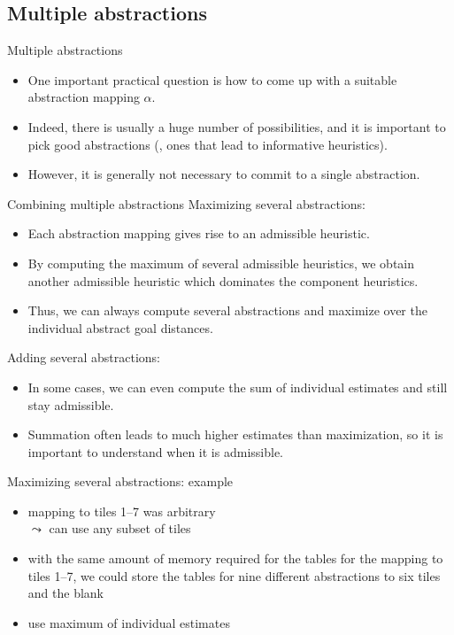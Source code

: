 \documentclass{gkibeamer}
\begin{document}
\subsection{Multiple abstractions}

\begin{frame}{Multiple abstractions}
  \begin{itemize}
  \item One important practical question is how to come up with
    a suitable abstraction mapping $\alpha$.
  \item Indeed, there is usually a \alert{huge number of
    possibilities}, and it is important to pick good abstractions
    (\ie, ones that lead to informative heuristics).
  \item However, it is generally \alert{not necessary to commit to a
    single abstraction}.
  \end{itemize}
\end{frame}

\begin{frame}{Combining multiple abstractions}
  \alert{Maximizing} several abstractions:
  \begin{itemize}
  \item Each abstraction mapping gives rise to an admissible
    heuristic.
  \item By computing the \alert{maximum} of several admissible
    heuristics, we obtain another admissible heuristic which
    \alert{dominates} the component heuristics.
  \item Thus, we can always compute several abstractions and maximize
    over the individual abstract goal distances.
  \end{itemize}

  \medskip

  \alert{Adding} several abstractions:
  \begin{itemize}
  \item In some cases, we can even compute the \alert{sum} of
    individual estimates and still stay admissible.
  \item Summation often leads to \alert{much higher estimates} than
    maximization, so it is \alert{important to understand when it is
      admissible}.
  \end{itemize}
\end{frame}

\begin{frame}{Maximizing several abstractions: example}
  \begin{example}[15-puzzle]
    \begin{itemize}
    \item mapping to tiles 1--7 was arbitrary \\
      $\leadsto$ can use \alert{any subset} of tiles
    \item with the same amount of memory required for the tables for
      the mapping to tiles 1--7, we could store the tables for
      \alert{nine different abstractions} to six tiles and the blank
    \item use \alert{maximum} of individual estimates
    \end{itemize}
  \end{example}
\end{frame}
\end{document}
